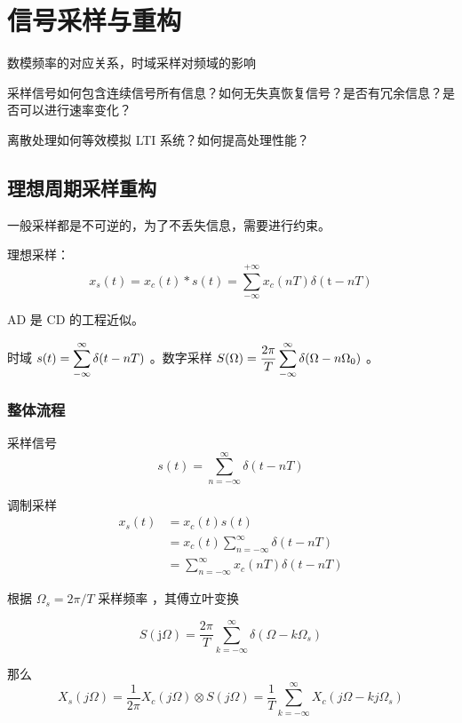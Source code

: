 \documentclass[cn,11pt,chinese,black,simple]{elegantbook}
\begin{document}
\fi 
\def\chapname{03sampandrebuild}

\chapter{信号采样与重构}

\begin{introduction}
    \item 数模频率的对应关系，时域采样对频域的影响
    \item 采样信号如何包含连续信号所有信息？如何无失真恢复信号？是否有冗余信息？是否可以进行速率变化？
    \item 离散处理如何等效模拟 LTI 系统？如何提高处理性能？
\end{introduction}

\section{理想周期采样重构}

一般采样都是不可逆的，为了不丢失信息，需要进行约束。

理想采样： \[x_{s}(t)=x_{c}(t) * s(t)=\sum_{-\infty}^{+\infty} x_{c}(n T) \delta(\mathrm{t}-n T)\]

AD 是 CD 的工程近似。

时域 \(s(t) = \displaystyle\sum_{-\infty}^\infty \delta(t-nT)\) 。数字采样 \(S(\Omega) = \dfrac{2 \pi}{T} \displaystyle\sum_{-\infty}^\infty \delta(\Omega - n \Omega_0)\) 。

\subsection{整体流程}

采样信号 \[s(t)=\sum_{n=-\infty}^{\infty} \delta(t-n T)\]

调制采样 \[\begin{aligned}
    x_{s}(t) &=x_{c}(t) s(t) \\
    &=x_{c}(t) \sum_{n=-\infty}^{\infty} \delta(t-n T) \\
    &= \sum_{n=-\infty}^{\infty} x_c(nT) \delta(t-n T) 
    \end{aligned}\]

根据 \(\Omega_s = 2\pi / T\) 采样频率 ，其傅立叶变换

\[S(\mathrm{j} \Omega)=\frac{2 \pi}{T} \sum_{k=-\infty}^{\infty} \delta\left(\Omega-k \Omega_{s}\right)\]

那么 \[X_s(j\Omega) = \frac{1}{2\pi} X_c(j\Omega) \otimes S(j\Omega) = \frac{1}{T} \sum_{k=-\infty}^\infty X_c(j\Omega - kj\Omega_s)\] 
\end{document}
